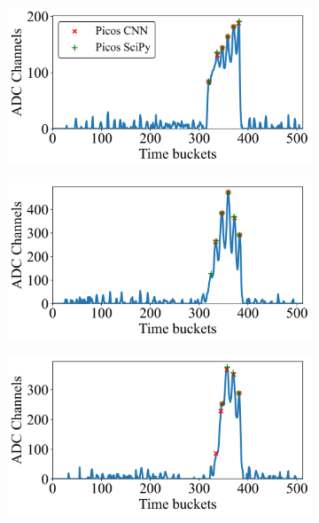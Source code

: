 \documentclass[a4paper,12pt,oneside]{book}
\begin{document}
\begin{figure}[H]
\centering
    \begin{subfigure}[b]{0.49\textwidth}
        \centering
        \includegraphics[scale=0.425]{figs/np_exs1.png}
        \caption{}
        \label{subfig:exs_n_peaks_1}
    \end{subfigure}%
    \hfill
    \begin{subfigure}[b]{0.465\textwidth}
        \centering
        \includegraphics[scale=0.425]{figs/np_exs2.png}
        \caption{}
        \label{subfig:exs_n_peaks_2}
    \end{subfigure}
    \begin{subfigure}[b]{0.49\textwidth}
        \centering
        \includegraphics[scale=0.425]{figs/np_exs3.png}

\end{subfigure}
\end{figure}
\end{document}
